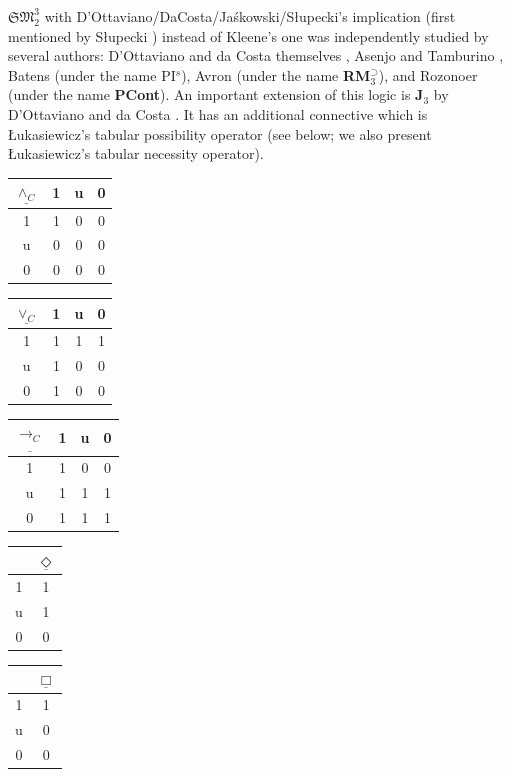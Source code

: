 \documentclass[11pt,a4paper,titlepage]{article}
\theoremstyle{definition}
\newcommand{\3}{\vspace{.3in}}
\newcommand{\2}{\vspace{.2in}}
\newcommand{\1}{\vspace{.1in}}
\newcommand{\5}{\vspace{.05in}}
\begin{document}
$\mathfrak{SM}_2^3$ with D'Ottaviano/DaCosta/Ja\'{s}kowski/S\l{}upecki's implication (first mentioned by S\l{}upecki \cite{Slupecki39}) instead of Kleene's one was independently studied by several authors: D'Ottaviano and da Costa themselves \cite{DOttavianodaCosta,daCosta}, Asenjo and Tamburino \cite{AsenjoTamburino}, Batens \cite{Batens} (under the name PI$^s$), Avron \cite{Avron86} (under the name {\bf RM$_3^\supset$}), and Rozonoer \cite{Rozonoer} (under the name \textbf{PCont}). An important extension of this logic is {\bf J$_3$} by D'Ottaviano and da Costa \cite{DOttavianodaCosta}. It has an additional connective which is \L ukasiewicz's tabular possibility operator (see below; we also present \L ukasiewicz's tabular necessity operator). 

\begin{center}
	\begin{tabular}{|c|ccc|}
		\hline
		$\underline{\wedge_C} $ & 1 & u & 0 \\
		\hline
		1 & 1 & 0 & 0 \\
		u & 0 & 0 & 0 \\
		0 & 0 & 0 & 0 \\
		\hline
	\end{tabular}
	\begin{tabular}{|c|ccc|}
		\hline$\underline{\vee_C} $ & 1 & u & 0 \\\hline
		1 & 1 & 1 & 1 \\
		u & 1 & 0 & 0 \\
		0 & 1 & 0 & 0 \\\hline
	\end{tabular}
	\begin{tabular}{|c|ccc|}
		\hline
		$\underline{\rightarrow_C} $ & 1 & u & 0 \\
		\hline
		1 & 1 & 0 & 0 \\
		u & 1 & 1 & 1 \\
		0 & 1 & 1 & 1 \\
		\hline
	\end{tabular}
\begin{tabular}{|c|c|}
	\hline & $\underline{\Diamond}$\\\hline
	1 & 1\\
	u & 1\\
	0 & 0\\\hline
\end{tabular}
\begin{tabular}{|c|c|}
	\hline & $\underline{\Box}$\\\hline
	1 & 1\\
	u & 0\\
	0 & 0\\\hline
\end{tabular}	
\end{center}
\end{document}
